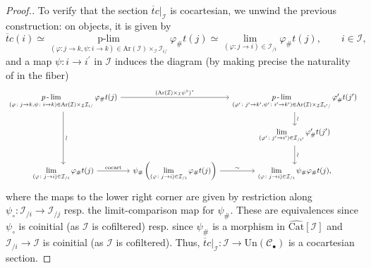 \documentclass[a4paper,reqno,10pt]{amsart}
\theoremstyle{definition}
\theoremstyle{remark}
\newcommand{\br}[1]{\left(#1\right)}
\newcommand{\sqb}[1]{\left\lbrack #1\right\rbrack}
\newcommand{\C}{\mathcal{C}}
\newcommand{\I}{\mathcal{I}}
\newcommand{\mhyphen}{\operatorname{-}}
\newcommand{\Un}{\mathrm{Un}}
\newcommand{\Cat}{\mathrm{Cat}}
\newcommand{\Ar}{\mathrm{Ar}}
\begin{document}
\begin{proof}[Proof.]
To verify that the section $\overline{t}c\vert_{\I}$ is cocartesian, we unwind the previous construction: on objects, it is given by
\begin{equation*}
\overline{t}c(i)\simeq\mathop{p\mhyphen\lim}\limits_{(\varphi\colon j\rightarrow k,\psi\colon i\rightarrow k)\in\Ar(\I)\times_{\I}\I_{i/}}\varphi_{\#}t(j)\simeq\lim_{(\varphi\colon j\rightarrow i)\in\I_{/i}}\varphi_{\#}t(j),\qquad i\in\I,
\end{equation*}
and a map $\psi\colon i\rightarrow i^{\prime}$ in $\I$ induces the diagram (by making precise the naturality of \cite[\href{https://kerodon.net/tag/069Z}{Tag 069Z}]{kerodon} in the fiber)
\begin{equation*}
\begin{tikzcd}[column sep=small]
\mathop{p\mhyphen\lim}\limits_{(\varphi\colon j\rightarrow k, \psi\colon i\rightarrow k)\in\Ar(\I)\times_{\I}\I_{i/}}\varphi_{\#}t(j)\arrow[rr,"(\Ar(\I)\times_{\I}\psi^{\circ})^{\ast}"]\arrow[dd,"\sim"{sloped}] & & \mathop{p\mhyphen\lim}\limits_{(\varphi^{\prime}\colon j^{\prime}\rightarrow k^{\prime}, \psi^{\prime}\colon i^{\prime}\rightarrow k^{\prime})\in\Ar(\I)\times_{\I}\I_{i^{\prime}/}}\varphi^{\prime}_{\#}t(j^{\prime})\arrow[d,"\sim"{sloped}]\\
& & \lim\limits_{(\varphi^{\prime}\colon j^{\prime}\rightarrow i^{\prime})\in\I_{/i^{\prime}}}\varphi^{\prime}_{\#}t(j^{\prime})\arrow[d,"\sim"{sloped}]\\
\lim\limits_{(\varphi\colon j\rightarrow i)\in\I_{/i}}\varphi_{\#}t(j)\arrow[r,"\mathrm{cocart}"] & \psi_{\#}\br{\lim\limits_{(\varphi\colon j\rightarrow i)\in\I_{/i}}\varphi_{\#}t(j)}\arrow[r,"\sim"] & \lim\limits_{(\varphi\colon j\rightarrow i)\in\I_{/i}}\psi_{\#}\varphi_{\#}t(j),
\end{tikzcd}
\end{equation*}
where the maps to the lower right corner are given by restriction along $\psi_{\circ}\colon\I_{/i}\rightarrow\I_{/j}$ resp. the limit-comparison map for $\psi_{\#}$. These are equivalences since $\psi_{\circ}$ is coinitial (as $\I$ is cofiltered) resp. since $\psi_{\#}$ is a morphism in $\widehat{\Cat}\sqb{\I}$ and $\I_{/i}\rightarrow\I$ is coinitial (as $\I$ is cofiltered). Thus, $\overline{t}c\vert_{\I}\colon\I\rightarrow\Un(\C_{\bullet})$ is a cocartesian section.


\end{proof}
\end{document}
